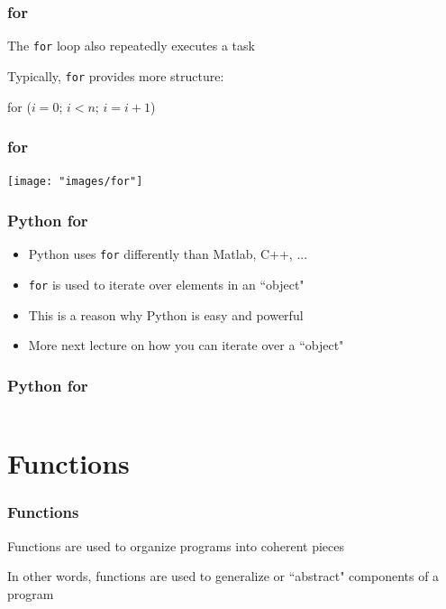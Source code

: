 \documentclass{beamer}
\begin{document}
\begin{frame}
\frametitle{for}
The \texttt{for} loop also repeatedly executes a task

\vspace{0.1in}

Typically, \texttt{for} provides more structure:

\vspace{0.1in}

\centering
for ($i = 0$; $i < n$; $i = i + 1$)

\end{frame}

\begin{frame}
\frametitle{for}

\centering
\texttt{[image: "images/for"]}
\end{frame}

\begin{frame}
\frametitle{Python for}
\begin{itemize}
\setlength{\itemsep}{0.2in}
\item{Python uses \texttt{for} differently than Matlab, C++, ...}
\item{\texttt{for} is used to iterate over elements in an ``object"}
\item{This is a reason why Python is easy and powerful}
\item{More next lecture on how you can iterate over a ``object"}
\end{itemize}

\end{frame}

\begin{frame}
\frametitle{Python for}

\begin{center}
\begin{tabular}{c}

\end{tabular}
\end{center}

\end{frame}


\section{Functions}
\begin{frame}
\frametitle{Functions}
Functions are used to organize programs into coherent pieces

\vspace{0.2in}

In other words, functions are used to generalize or ``abstract" components of a program 
\end{frame}
\end{document}
